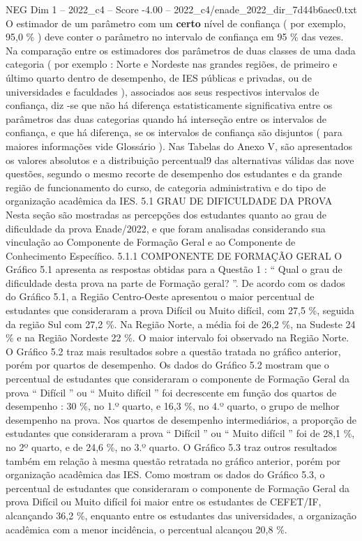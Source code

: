 \begin{textsample}{NEG Dim 1 – 2022\_c4 – Score -4.00 – 2022\_c4/enade\_2022\_dir\_7d44b6aec0.txt}
O estimador de um parâmetro com um \textbf{certo} nível de confiança ( por exemplo, 95,0 \% ) deve conter o parâmetro no intervalo de confiança em 95 \% das vezes.
Na comparação entre os estimadores dos parâmetros de duas classes de uma dada categoria ( por exemplo : Norte e Nordeste nas grandes regiões, de primeiro e último quarto dentro de desempenho, de IES públicas e privadas, ou de universidades e faculdades ), associados aos seus respectivos intervalos de confiança, diz -se que não há diferença estatisticamente significativa entre os parâmetros das duas categorias quando há interseção entre os intervalos de confiança, e que há diferença, se os intervalos de confiança são disjuntos ( para maiores informações vide Glossário ).
Nas Tabelas do Anexo V, são apresentados os valores absolutos e a distribuição percentual9 das alternativas válidas das nove questões, segundo o mesmo recorte de desempenho dos estudantes e da grande região de funcionamento do curso, de categoria administrativa e do tipo de organização acadêmica da IES. 5.1 GRAU DE DIFICULDADE DA PROVA Nesta seção são mostradas as percepções dos estudantes quanto ao grau de dificuldade da prova Enade/2022, e que foram analisadas considerando sua vinculação ao Componente de Formação Geral e ao Componente de Conhecimento Específico. 5.1.1 COMPONENTE DE FORMAÇÃO GERAL O Gráfico 5.1 apresenta as respostas obtidas para a Questão 1 : “ Qual o grau de dificuldade desta prova na parte de Formação geral? ”.
De acordo com os dados do Gráfico 5.1, a Região Centro-Oeste apresentou o maior percentual de estudantes que consideraram a prova Difícil ou Muito difícil, com 27,5 \%, seguida da região Sul com 27,2 \%.
Na Região Norte, a média foi de 26,2 \%, na Sudeste 24 \% e na Região Nordeste 22 \%.
O maior intervalo foi observado na Região Norte.
O Gráfico 5.2 traz mais resultados sobre a questão tratada no gráfico anterior, porém por quartos de desempenho.
Os dados do Gráfico 5.2 mostram que o percentual de estudantes que consideraram o componente de Formação Geral da prova “ Difícil ” ou “ Muito difícil ” foi decrescente em função dos quartos de desempenho : 30 \%, no 1.º quarto, e 16,3 \%, no 4.º quarto, o grupo de melhor desempenho na prova.
Nos quartos de desempenho intermediários, a proporção de estudantes que consideraram a prova “ Difícil ” ou “ Muito difícil ” foi de 28,1 \%, no 2º quarto, e de 24,6 \%, no 3.º quarto.
O Gráfico 5.3 traz outros resultados também em relação à mesma questão retratada no gráfico anterior, porém por organização acadêmica das IES.
Como mostram os dados do Gráfico 5.3, o percentual de estudantes que consideraram o componente de Formação Geral da prova Difícil ou Muito difícil foi maior entre os estudantes de CEFET/IF, alcançando 36,2 \%, enquanto entre os estudantes das universidades, a organização acadêmica com a menor incidência, o percentual alcançou 20,8 \%.

\end{textsample}
